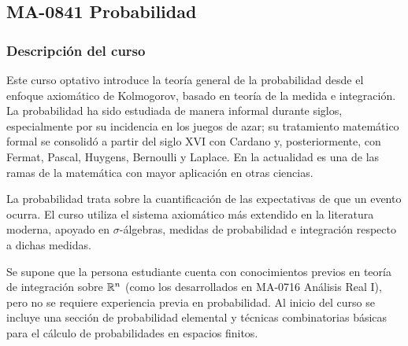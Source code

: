 \newpage
\subsection*{MA-0841 Probabilidad}

\hypertarget{MA0841}{}
\begin{refsection}
\begin{table}[H]
\end{table}

\subsubsection*{Descripción del curso}

Este curso optativo introduce la teoría general de la probabilidad desde el enfoque axiomático de Kolmogorov, basado en teoría de la medida e integración. La probabilidad ha sido estudiada de manera informal durante siglos, especialmente por su incidencia en los juegos de azar; su tratamiento matemático formal se consolidó a partir del siglo XVI con Cardano y, posteriormente, con Fermat, Pascal, Huygens, Bernoulli y Laplace. En la actualidad es una de las ramas de la matemática con mayor aplicación en otras ciencias.

La probabilidad trata sobre la cuantificación de las expectativas de que un evento ocurra. El curso utiliza el sistema axiomático más extendido en la literatura moderna, apoyado en $\sigma$-álgebras, medidas de probabilidad e integración respecto a dichas medidas.

Se supone que la persona estudiante cuenta con conocimientos previos en teoría de integración sobre $\mathbb{R}^n$ (como los desarrollados en MA-0716 Análisis Real I), pero no se requiere experiencia previa en probabilidad. Al inicio del curso se incluye una sección de probabilidad elemental y técnicas combinatorias básicas para el cálculo de probabilidades en espacios finitos.


\end{refsection}
